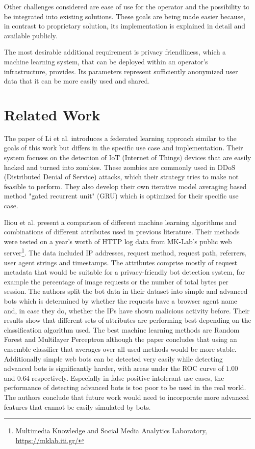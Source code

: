 \documentclass[
    fontsize=12pt,
    headings=small,
    parskip=half,           %
    bibliography=totoc,
    numbers=noenddot,       %
    open=any,               %
    final,                   %
    table
]{scrreprt}
\begin{document}
Other challenges considered are ease of use for the operator and the possibility to be integrated into existing solutions. These goals are being made easier because, in contrast to proprietary solution, its implementation is explained in detail and available publicly.

The most desirable additional requirement is privacy friendliness, which a machine learning system, that can be deployed within an operator's infrastructure, provides. Its parameters represent sufficiently anonymized user data that it can be more easily used and shared.

\section{Related Work}

The paper of Li et al. \cite{LiJi2021} introduces a federated learning approach similar to the goals of this work but differs in the specific use case and implementation. Their system focuses on the detection of IoT (Internet of Things) devices that are easily hacked and turned into zombies. These zombies are commonly used in DDoS (Distributed Denial of Service) attacks, which their strategy tries to make not feasible to perform. They also develop their own iterative model averaging based method "gated recurrent unit" (GRU) which is optimized for their specific use case.

Iliou et al. \cite{10.1145/3339252.3339267} present a comparison of different machine learning algorithms and combinations of different attributes used in previous literature. Their methods were tested on a year's worth of HTTP log data from MK-Lab's public web server\footnote{Multimedia Knowledge and Social Media Analytics Laboratory, \url{https://mklab.iti.gr/}}. The data included IP addresses, request method, request path, referrers, user agent strings and timestamps. The attributes comprise mostly of request metadata that would be suitable for a privacy-friendly bot detection system, for example the percentage of image requests or the number of total bytes per session. The authors split the bot data in their dataset into simple and advanced bots which is determined by whether the requests have a browser agent name and, in case they do, whether the IPs have shown malicious activity before. Their results show that different sets of attributes are performing best depending on the classification algorithm used. The best machine learning methods are Random Forest and Multilayer Perceptron although the paper concludes that using an ensemble classifier that averages over all used methods would be more stable. Additionally simple web bots can be detected very easily while detecting advanced bots is significantly harder, with areas under the ROC curve of $1.00$ and $0.64$ respectively. Especially in false positive intolerant use cases, the performance of detecting advanced bots is too poor to be used in the real world. The authors conclude that future work would need to incorporate more advanced features that cannot be easily simulated by bots.
\end{document}
